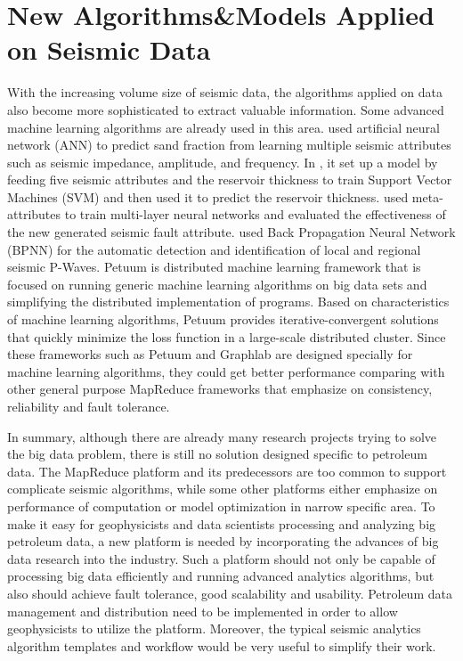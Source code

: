 \section{New Algorithms\&Models Applied on Seismic Data}
With the increasing volume size of seismic data, the algorithms applied on data also become more sophisticated to extract valuable information. Some advanced machine learning algorithms are already used in this area. \cite{7067356ChakiPredictSandNeuralNetwork} used artificial neural network (ANN) to predict sand fraction from learning multiple seismic attributes such as seismic impedance, amplitude, and frequency. In \cite{6234749DengSVMPredictReservoir}, it set up a model by feeding five seismic attributes and the reservoir thickness to train Support Vector Machines (SVM) and then used it to predict the reservoir thickness. \cite{4026836MachadoNerualNetworksFault} used meta-attributes to train multi-layer neural networks and evaluated the effectiveness of the new generated seismic fault attribute. \cite{6707117KaurPWaveANN} used Back Propagation Neural Network (BPNN) for the automatic detection and identification of local and regional seismic P-Waves. 
Petuum \cite{Dai2013Petuum} is distributed machine learning framework that is focused on running generic machine learning algorithms on big data sets and simplifying the distributed implementation of programs. Based on characteristics of machine learning algorithms, Petuum provides iterative-convergent solutions that quickly minimize the loss function in a large-scale distributed cluster. Since these frameworks such as Petuum and Graphlab \cite{DatoGraphLab} are designed specially for machine learning algorithms, they could get better performance comparing with other general purpose MapReduce frameworks that emphasize on consistency, reliability and fault tolerance. 

In summary, although there are already many research projects trying to solve the big data problem, there is still no solution designed specific to petroleum data. The MapReduce platform and its predecessors are too common to support complicate seismic algorithms, while some other platforms either emphasize on performance of computation or model optimization in narrow specific area.
To make it easy for geophysicists and data scientists processing and analyzing big petroleum data, a new platform is needed by incorporating the advances of big data research into the industry. Such a platform should not only be capable of processing big data efficiently and running advanced analytics algorithms, but also should achieve fault tolerance, good scalability and usability. Petroleum data management and distribution need to be implemented in order to allow geophysicists to utilize the platform. Moreover, the typical seismic analytics algorithm templates and workflow would be very useful to simplify their work. 


